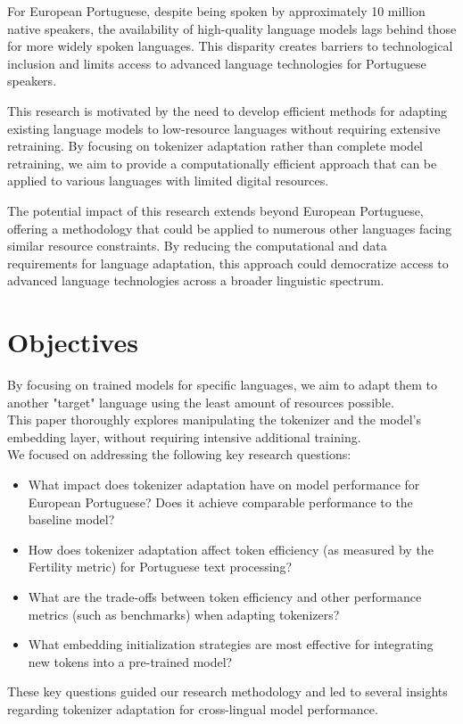 For European Portuguese, despite being spoken by approximately 10 million native speakers, the availability of high-quality language models lags behind those for more widely spoken languages. This disparity creates barriers to technological inclusion and limits access to advanced language technologies for Portuguese speakers.

This research is motivated by the need to develop efficient methods for adapting existing language models to low-resource languages without requiring extensive retraining. By focusing on tokenizer adaptation rather than complete model retraining, we aim to provide a computationally efficient approach that can be applied to various languages with limited digital resources.

The potential impact of this research extends beyond European Portuguese, offering a methodology that could be applied to numerous other languages facing similar resource constraints. By reducing the computational and data requirements for language adaptation, this approach could democratize access to advanced language technologies across a broader linguistic spectrum.

\section{Objectives}\label{Section1.2}
By focusing on trained models for specific languages, we aim to adapt them to another "target" language using the least amount of resources possible.\\
This paper thoroughly explores manipulating the tokenizer  and the model's embedding layer, without requiring intensive additional training.\\

We focused on addressing the following key research questions:
\begin{itemize}
    \item What impact does tokenizer adaptation have on model performance for European Portuguese? Does it achieve comparable performance to the baseline model?
    
    \item How does tokenizer adaptation affect token efficiency (as measured by the Fertility metric) for Portuguese text processing?
    
    \item What are the trade-offs between token efficiency and other performance metrics (such as benchmarks) when adapting tokenizers?
    
    \item What embedding initialization strategies are most effective for integrating new tokens into a pre-trained model?
\end{itemize}
These key questions guided our research methodology and led to several insights regarding tokenizer adaptation for cross-lingual model performance.

